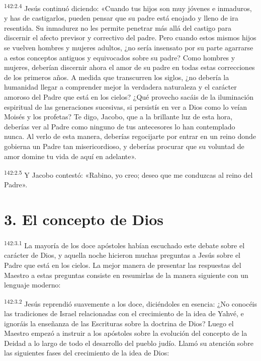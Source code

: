 \par
\textsuperscript{142:2.4} Jesús continuó diciendo: «Cuando tus hijos son muy jóvenes e inmaduros, y has de castigarlos, pueden pensar que su padre está enojado y lleno de ira resentida. Su inmadurez no les permite penetrar más allá del castigo para discernir el afecto previsor y correctivo del padre. Pero cuando estos mismos hijos se vuelven hombres y mujeres adultos, ¿no sería insensato por su parte agarrarse a estos conceptos antiguos y equivocados sobre su padre? Como hombres y mujeres, deberían discernir ahora el amor de su padre en todas estas correcciones de los primeros años. A medida que transcurren los siglos, ¿no debería la humanidad llegar a comprender mejor la verdadera naturaleza y el carácter amoroso del Padre que está en los cielos? ¿Qué provecho sacáis de la iluminación espiritual de las generaciones sucesivas, si persistís en ver a Dios como lo veían Moisés y los profetas? Te digo, Jacobo, que a la brillante luz de esta hora, deberías ver al Padre como ninguno de tus antecesores lo han contemplado nunca. Al verlo de esta manera, deberías regocijarte por entrar en un reino donde gobierna un Padre tan misericordioso, y deberías procurar que su voluntad de amor domine tu vida de aquí en adelante».

\par
\textsuperscript{142:2.5} Y Jacobo contestó: «Rabino, yo creo; deseo que me conduzcas al reino del Padre».

\section*{3. El concepto de Dios}
\par
\textsuperscript{142:3.1} La mayoría de los doce apóstoles habían escuchado este debate sobre el carácter de Dios, y aquella noche hicieron muchas preguntas a Jesús sobre el Padre que está en los cielos. La mejor manera de presentar las respuestas del Maestro a estas preguntas consiste en resumirlas de la manera siguiente con un lenguaje moderno:

\par
\textsuperscript{142:3.2} Jesús reprendió suavemente a los doce, diciéndoles en esencia: ¿No conocéis las tradiciones de Israel relacionadas con el crecimiento de la idea de Yahvé, e ignoráis la enseñanza de las Escrituras sobre la doctrina de Dios? Luego el Maestro empezó a instruir a los apóstoles sobre la evolución del concepto de la Deidad a lo largo de todo el desarrollo del pueblo judío. Llamó su atención sobre las siguientes fases del crecimiento de la idea de Dios:

